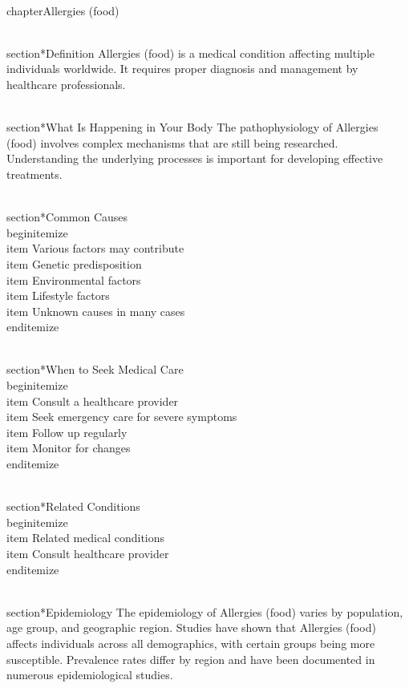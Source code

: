 
\\chapter{Allergies (food)}

\\section*{Definition}
Allergies (food) is a medical condition affecting multiple individuals worldwide. It requires proper diagnosis and management by healthcare professionals.

\\section*{What Is Happening in Your Body}
The pathophysiology of Allergies (food) involves complex mechanisms that are still being researched. Understanding the underlying processes is important for developing effective treatments.

\\section*{Common Causes}
\\begin{itemize}
\\item Various factors may contribute\n  \\item Genetic predisposition\n  \\item Environmental factors\n  \\item Lifestyle factors\n  \\item Unknown causes in many cases
\\end{itemize}

\\section*{When to Seek Medical Care}
\\begin{itemize}
\\item Consult a healthcare provider\n  \\item Seek emergency care for severe symptoms\n  \\item Follow up regularly\n  \\item Monitor for changes
\\end{itemize}

\\section*{Related Conditions}
\\begin{itemize}
\\item Related medical conditions\n  \\item Consult healthcare provider
\\end{itemize}

\\section*{Epidemiology}
The epidemiology of Allergies (food) varies by population, age group, and geographic region. Studies have shown that Allergies (food) affects individuals across all demographics, with certain groups being more susceptible. Prevalence rates differ by region and have been documented in numerous epidemiological studies.

